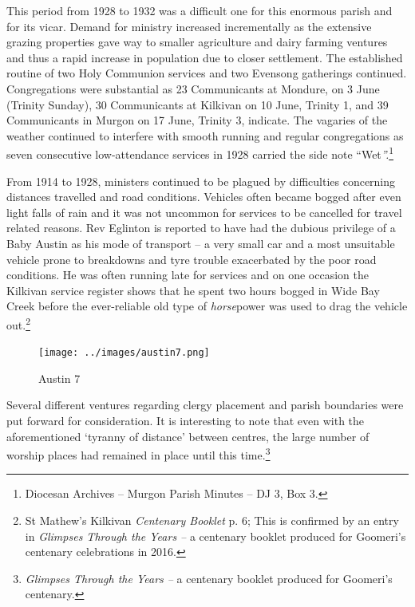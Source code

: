 This period from 1928 to 1932 was a difficult one for this enormous parish and for its vicar. Demand for ministry increased incrementally as the extensive grazing properties gave way to smaller agriculture and dairy farming ventures and thus a rapid increase in population due to closer settlement. The established routine of two Holy Communion services and two Evensong gatherings continued. Congregations were substantial as 23 Communicants at Mondure, on 3 June (Trinity Sunday), 30 Communicants at Kilkivan on 10 June, Trinity 1, and 39 Communicants in Murgon on 17 June, Trinity 3, indicate. The vagaries of the weather continued to interfere with smooth running and regular congregations as seven consecutive low-attendance services in 1928 carried the side note ``Wet\emph{''.}\footnote{Diocesan Archives -- Murgon Parish Minutes -- DJ 3, Box 3.}


From 1914 to 1928, ministers continued to be plagued by difficulties concerning distances travelled and road conditions. Vehicles often became bogged after even light falls of rain and it was not uncommon for services to be cancelled for travel related reasons. Rev Eglinton is reported to have had the dubious privilege of a Baby Austin as his mode of transport -- a very small car and a most unsuitable vehicle prone to breakdowns and tyre trouble exacerbated by the poor road conditions. He was often running late for services and on one occasion the Kilkivan service register shows that he spent two hours bogged in Wide Bay Creek before the ever-reliable old type of \emph{horse}power was used to drag the vehicle out.\footnote{St Mathew's Kilkivan \emph{Centenary Booklet} p. 6; This is confirmed by an entry in \emph{Glimpses Through the Years --} a centenary booklet produced for Goomeri's centenary celebrations in 2016.}








\begin{figure}[!htb]
\begin{center}
\texttt{[image: ../images/austin7.png]}
\caption{Austin 7}
\end{center}
\end{figure}




Several different ventures regarding clergy placement and parish boundaries were put forward for consideration. It is interesting to note that even with the aforementioned `tyranny of distance' between centres, the large number of worship places had remained in place until this time.\footnote{\emph{Glimpses Through the Years --} a centenary booklet produced for Goomeri's centenary.}


